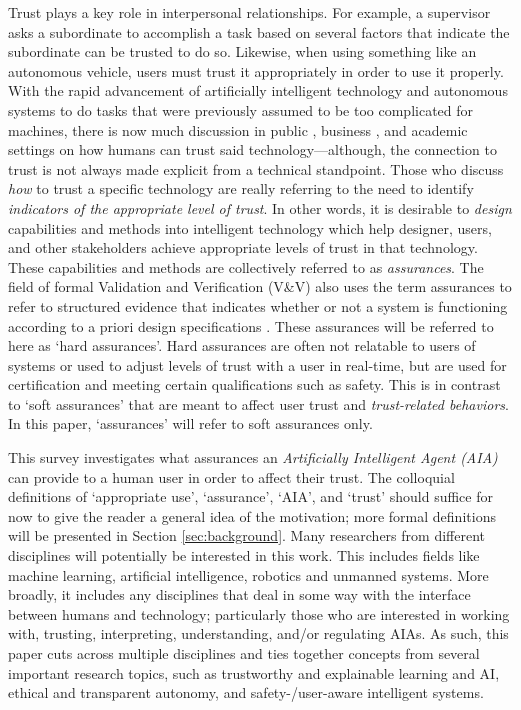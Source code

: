Trust plays a key role in interpersonal relationships. For example, a supervisor asks a subordinate to accomplish a task based on several factors that indicate the subordinate can be trusted to do so. Likewise, when using something like an autonomous vehicle, users must trust it appropriately in order to use it properly. With the rapid advancement of artificially intelligent technology and autonomous systems to do tasks that were previously assumed to be too complicated for machines, there is now much discussion in public \cite{Spectrum2016-jv,DeSteno2014-cq,Wagner2016-ck}, business \cite{Banavar2016-nm, Khosravi2016-ke,Tankard2016-rk}, and academic settings \cite{Foley2017-qj,Castelvecchi2016-mr,Lahijanian2016-nd} on how humans can trust said technology---although, the connection to trust is not always made explicit from a technical standpoint. Those who discuss \emph{how} to trust a specific technology are really referring to the need to identify \emph{indicators of the appropriate level of trust}. 
In other words, it is desirable to \emph{design} capabilities and methods into intelligent technology which help designer, users, and other stakeholders achieve appropriate levels of trust in that technology. These capabilities and methods are collectively referred to as \textit{assurances}. The field of formal Validation and Verification (V\&V) also uses the term assurances to refer to structured evidence that indicates whether or not a system is functioning according to a priori design specifications \cite{Calinescu2017-fh}. These assurances will be referred to here as `hard assurances'. Hard assurances are often not relatable to users of systems or used to adjust levels of trust with a user in real-time, but are used for certification and meeting certain qualifications such as safety. This is in contrast to `soft assurances' that are meant to affect user trust and \emph{trust-related behaviors}. In this paper, `assurances' will refer to soft assurances only.
    
This survey investigates what assurances an \emph{Artificially Intelligent Agent (AIA)} can provide to a human user in order to affect their trust. The colloquial definitions of `appropriate use', `assurance', `AIA', and `trust' should suffice for now to give the reader a general idea of the motivation; more formal definitions will be presented in Section \ref{sec:background}. 
Many researchers from different disciplines will potentially be interested in this work. This includes fields like machine learning, artificial intelligence, robotics and unmanned systems. More broadly, it includes any disciplines that deal in some way with the interface between humans and technology; particularly those who are interested in working with, trusting, interpreting, understanding, and/or regulating AIAs. As such, this paper cuts across multiple disciplines and ties together concepts from several important research topics, such as trustworthy and explainable learning and AI, ethical and transparent autonomy, and safety-/user-aware intelligent systems.

